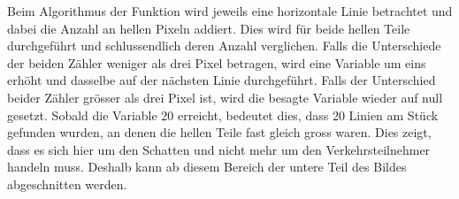 Beim Algorithmus der Funktion wird jeweils eine horizontale Linie betrachtet und dabei die Anzahl an hellen Pixeln addiert. Dies wird für beide hellen Teile durchgeführt und schlussendlich deren Anzahl verglichen. Falls die Unterschiede der beiden Zähler weniger als drei Pixel betragen, wird eine Variable um eins erhöht und dasselbe auf der nächsten Linie durchgeführt. Falls der Unterschied beider Zähler grösser als drei Pixel ist, wird die besagte Variable wieder auf null gesetzt. Sobald die Variable 20 erreicht, bedeutet dies, dass 20 Linien am Stück gefunden wurden, an denen die hellen Teile fast gleich gross waren. Dies zeigt, dass es sich hier um den Schatten und nicht mehr um den Verkehrsteilnehmer handeln muss. Deshalb kann ab diesem Bereich der untere Teil des Bildes abgeschnitten werden.\\\\
